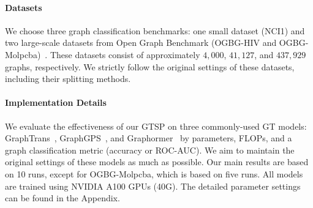 \documentclass[letterpaper]{article} %
\begin{document}
\paragraph{Datasets} We choose three graph classification benchmarks: one small dataset (NCI1) and two large-scale datasets from Open Graph Benchmark (OGBG-HIV and OGBG-Molpcba)~\cite{ogb-dataset}. These datasets consist of approximately $4,000$, $41,127$, and $437,929$ graphs, respectively. We strictly follow the original settings of these datasets, including their splitting methods.



\paragraph{Implementation Details} 
We evaluate the effectiveness of our GTSP on three commonly-used GT models: GraphTrans~\cite{graphtrans}, GraphGPS~\cite{graphgps}, and Graphormer~\cite{graphormer-v1} by parameters, FLOPs, and a graph classification metric (accuracy or ROC-AUC). We aim to maintain the original settings of these models 
as much as possible. Our main results are based on 10 runs, except for OGBG-Molpcba, which is based on five runs. All models are trained using NVIDIA A100 GPUs (40G). The detailed parameter settings can be found in the Appendix.

\end{document}
